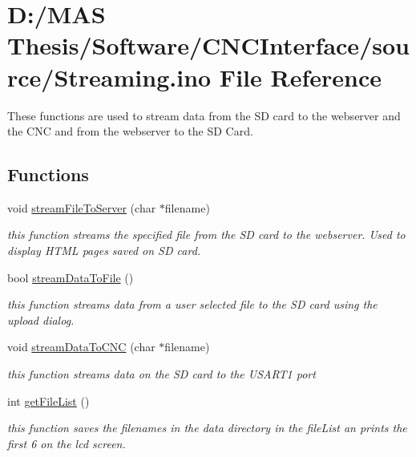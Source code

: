\hypertarget{_streaming_8ino}{\section{D\-:/\-M\-A\-S Thesis/\-Software/\-C\-N\-C\-Interface/source/\-Streaming.ino File Reference}
\label{_streaming_8ino}
}


These functions are used to stream data from the S\-D card to the webserver and the C\-N\-C and from the webserver to the S\-D Card.  


\subsection*{Functions}
\begin{DoxyCompactItemize}
\item 
void \hyperlink{_streaming_8ino_a42680af0c326ceca0505e652c7184653}{stream\-File\-To\-Server} (char $\ast$filename)
\begin{DoxyCompactList}\small\item\em this function streams the specified file from the S\-D card to the webserver. Used to display H\-T\-M\-L pages saved on S\-D card. \end{DoxyCompactList}\item 
\hypertarget{_streaming_8ino_a17d101103aa11e97fc8ffcb5d3dad9e9}{bool \hyperlink{_streaming_8ino_a17d101103aa11e97fc8ffcb5d3dad9e9}{stream\-Data\-To\-File} ()}\label{_streaming_8ino_a17d101103aa11e97fc8ffcb5d3dad9e9}

\begin{DoxyCompactList}\small\item\em this function streams data from a user selected file to the S\-D card using the upload dialog. \end{DoxyCompactList}\item 
void \hyperlink{_streaming_8ino_a466dd01de4cf8bd7bbc6f9320d076e70}{stream\-Data\-To\-C\-N\-C} (char $\ast$filename)
\begin{DoxyCompactList}\small\item\em this function streams data on the S\-D card to the U\-S\-A\-R\-T1 port \end{DoxyCompactList}\item 
\hypertarget{_streaming_8ino_a843c9fb1d19ac7830ad2c77d75025185}{int \hyperlink{_streaming_8ino_a843c9fb1d19ac7830ad2c77d75025185}{get\-File\-List} ()}\label{_streaming_8ino_a843c9fb1d19ac7830ad2c77d75025185}

\begin{DoxyCompactList}\small\item\em this function saves the filenames in the data directory in the file\-List an prints the first 6 on the lcd screen. \end{DoxyCompactList}\end{DoxyCompactItemize}


